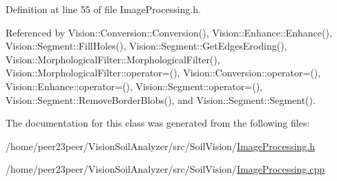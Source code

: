 Definition at line 55 of file Image\+Processing.\+h.



Referenced by Vision\+::\+Conversion\+::\+Conversion(), Vision\+::\+Enhance\+::\+Enhance(), Vision\+::\+Segment\+::\+Fill\+Holes(), Vision\+::\+Segment\+::\+Get\+Edges\+Eroding(), Vision\+::\+Morphological\+Filter\+::\+Morphological\+Filter(), Vision\+::\+Morphological\+Filter\+::operator=(), Vision\+::\+Conversion\+::operator=(), Vision\+::\+Enhance\+::operator=(), Vision\+::\+Segment\+::operator=(), Vision\+::\+Segment\+::\+Remove\+Border\+Blobs(), and Vision\+::\+Segment\+::\+Segment().



The documentation for this class was generated from the following files\+:\begin{DoxyCompactItemize}
\item 
/home/peer23peer/\+Vision\+Soil\+Analyzer/src/\+Soil\+Vision/\hyperlink{_image_processing_8h}{Image\+Processing.\+h}\item 
/home/peer23peer/\+Vision\+Soil\+Analyzer/src/\+Soil\+Vision/\hyperlink{_image_processing_8cpp}{Image\+Processing.\+cpp}\end{DoxyCompactItemize}
